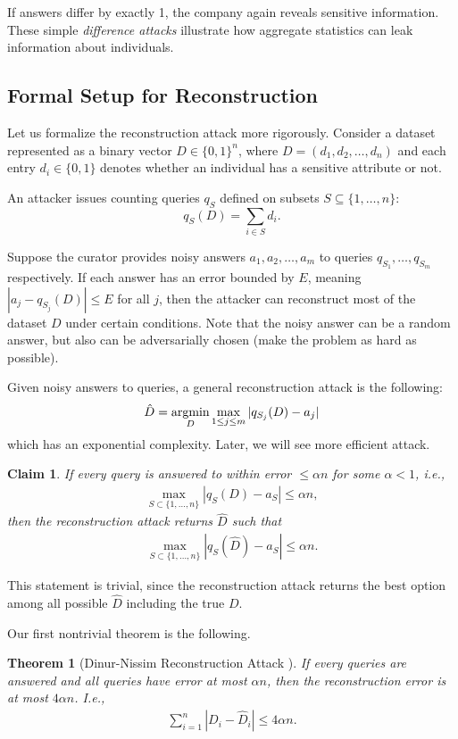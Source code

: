 \documentclass[11pt, a4paper]{article}
\newtheorem{theorem}{Theorem}
\newtheorem{claim}{Claim}
\begin{document}
If answers differ by exactly 1, the company again reveals sensitive information. 
These simple \emph{difference attacks} illustrate how aggregate statistics can leak information about individuals.

\subsection{Formal Setup for Reconstruction}

Let us formalize the reconstruction attack more rigorously. Consider a dataset represented as a binary vector $D \in \{0,1\}^n$, where $D=(d_1,d_2,\dots,d_n)$ and each entry $d_i \in \{0,1\}$ denotes whether an individual has a sensitive attribute or not.

An attacker issues counting queries $q_S$ defined on subsets $S \subseteq \{1,\dots,n\}$:
\[
q_S(D) = \sum_{i \in S} d_i.
\]

Suppose the curator provides noisy answers $a_1, a_2, \dots, a_m$ to queries $q_{S_1}, \dots, q_{S_m}$ respectively.
If each answer has an error bounded by $E$, meaning $|a_j - q_{S_j}(D)| \le E$ for all $j$, then the attacker can reconstruct most of the dataset $D$ under certain conditions.
Note that the noisy answer can be a random answer, but also can be adversarially chosen (make the problem as hard as possible).

Given noisy answers to queries, a general reconstruction attack is the following:
\begin{align}
    \hat{D} = \mathop{\mbox{{\rm argmin}}}\limits_D \max_{1\leq j\leq m} |q_{S_j}(D) - a_j|
\end{align}
which has an exponential complexity.
Later, we will see more efficient attack.
\begin{claim}
    If every query is answered to within error $\leq \alpha n$ for some $\alpha<1$, i.e.,
    \begin{align}
        \max_{S\subset \{1, \dots, n\}} |q_S(D) - a_S| \leq \alpha n,
    \end{align}
    then the reconstruction attack returns $\hat{D}$ such that
    \begin{align}
        \max_{S\subset \{1, \dots, n\}} |q_S(\hat{D}) - a_S| \leq \alpha n.
    \end{align}
\end{claim}
This statement is trivial, since the reconstruction attack returns the best option among all possible $\hat{D}$ including the true $D$.

Our first nontrivial theorem is the following.
\begin{theorem}[Dinur-Nissim Reconstruction Attack \cite{DinurNissim2003}]
    If every queries are answered and all queries have error at most $\alpha n$, then the reconstruction error is at most $4\alpha n$. I.e.,
    \begin{align}
        \sum_{i=1}^n |D_i - \hat{D}_i| \leq 4\alpha n.
    \end{align}
\end{theorem}
\end{document}
